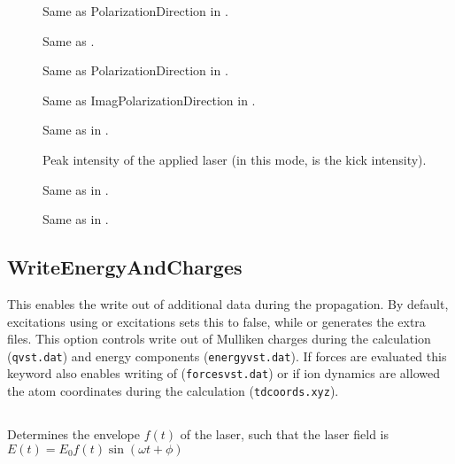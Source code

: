 \begin{description}
 \item[] Same as PolarizationDirection in .

 \item[] Same as .

 \item[] Same as PolarizationDirection in .

 \item[] Same as ImagPolarizationDirection in .

 \item[]  Same as in .

 \item[] Peak intensity of the applied laser (in
   this mode,  is the kick intensity).

 \item[] Same as in .

 \item[] Same as in .
\end{description}

\subsection{WriteEnergyAndCharges}
\label{sec:dftbp.tdextra}

This enables the write out of additional data during the propagation. By
default, excitations using  or  excitations sets this
to false, while  or  generates the extra files. This option
controls write out of Mulliken charges during the calculation (\verb|qvst.dat|)
and energy components (\verb|energyvst.dat|). If forces are evaluated this
keyword also enables writing of (\verb|forcesvst.dat|) or if ion dynamics are
allowed the atom coordinates during the calculation (\verb|tdcoords.xyz|).

\subsection{}
\label{sec:dftbp.envelope}

Determines the envelope $f(t)$ of the laser, such that the laser field
is $E(t) = E_0 f(t) \sin(\omega t + \phi) $

\paragraph{}


